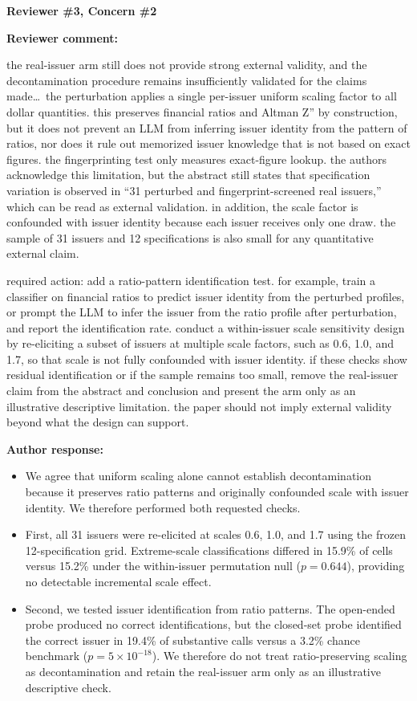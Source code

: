 \documentclass[11pt]{article}
\newcommand{\rvcomment}[1]{{\color{ReviewerGreen}#1}}
\newcommand{\concern}[1]{\textbf{\color{ReviewerGreen}#1}}
\begin{document}
\vspace{4pt}

\concern{Reviewer \#3, Concern \#2}

\concern{Reviewer comment:}

\rvcomment{the real-issuer arm still does not provide strong external validity, and the
decontamination procedure remains insufficiently validated for the claims made\dots\ the perturbation
applies a single per-issuer uniform scaling factor to all dollar quantities. this preserves financial
ratios and Altman Z'' by construction, but it does not prevent an LLM from inferring issuer identity
from the pattern of ratios, nor does it rule out memorized issuer knowledge that is not based on
exact figures. the fingerprinting test only measures exact-figure lookup. the authors acknowledge
this limitation, but the abstract still states that specification variation is observed in ``31
perturbed and fingerprint-screened real issuers,'' which can be read as external validation. in
addition, the scale factor is confounded with issuer identity because each issuer receives only one
draw. the sample of 31 issuers and 12 specifications is also small for any quantitative external
claim.}

\rvcomment{required action: add a ratio-pattern identification test. for example, train a classifier
on financial ratios to predict issuer identity from the perturbed profiles, or prompt the LLM to
infer the issuer from the ratio profile after perturbation, and report the identification rate.
conduct a within-issuer scale sensitivity design by re-eliciting a subset of issuers at multiple
scale factors, such as 0.6, 1.0, and 1.7, so that scale is not fully confounded with issuer
identity. if these checks show residual identification or if the sample remains too small, remove
the real-issuer claim from the abstract and conclusion and present the arm only as an illustrative
descriptive limitation. the paper should not imply external validity beyond what the design can
support.}

\textbf{Author response:}

\begin{itemize}
\item We agree that uniform scaling alone cannot establish decontamination because it preserves ratio
patterns and originally confounded scale with issuer identity. We therefore performed both
requested checks.
\item First, all 31 issuers were re-elicited at scales 0.6, 1.0, and 1.7 using the frozen
12-specification grid. Extreme-scale classifications differed in 15.9\% of cells versus 15.2\%
under the within-issuer permutation null ($p=0.644$), providing no detectable incremental scale
effect.
\item Second, we tested issuer identification from ratio patterns. The open-ended probe produced no
correct identifications, but the closed-set probe identified the correct issuer in 19.4\% of
substantive calls versus a 3.2\% chance benchmark ($p=5\times10^{-18}$). We therefore do
not treat ratio-preserving scaling as decontamination and retain the real-issuer arm only
as an illustrative descriptive check.
\end{itemize}
\end{document}
